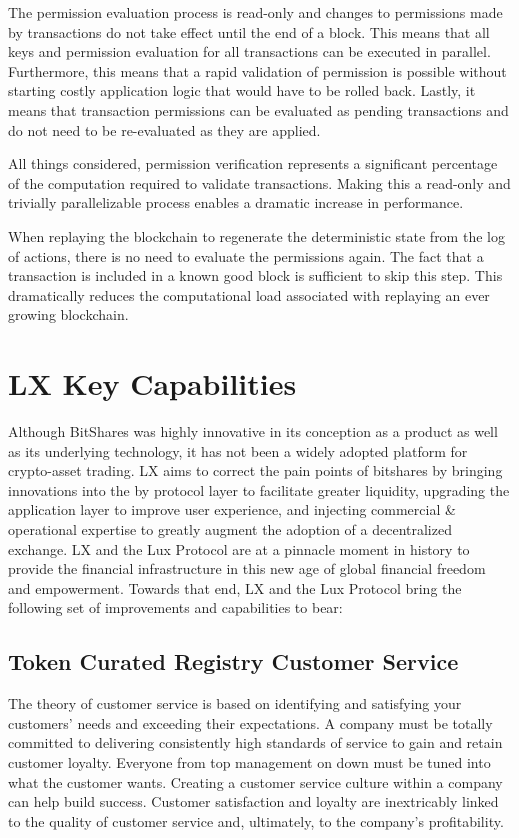 \documentclass[11pt]{article}
\begin{document}
The permission evaluation process is read-only and changes to permissions made by transactions do not take effect until the end of a block. This means that all keys and permission evaluation for all transactions can be executed in parallel. Furthermore, this means that a rapid validation of permission is possible without starting costly application logic that would have to be rolled back. Lastly, it means that transaction permissions can be evaluated as pending transactions and do not need to be re-evaluated as they are applied.


All things considered, permission verification represents a significant percentage of the computation required to validate transactions. Making this a read-only and trivially parallelizable process enables a dramatic increase in performance.


When replaying the blockchain to regenerate the deterministic state from the log of actions, there is no need to evaluate the permissions again. The fact that a transaction is included in a known good block is sufficient to skip this step. This dramatically reduces the computational load associated with replaying an ever growing blockchain.


\section{LX Key Capabilities}

Although BitShares was highly innovative in its conception as a product as well as its underlying technology, it has not been a widely adopted platform for crypto-asset trading. LX aims to correct the pain points of bitshares by bringing innovations into the by protocol layer to facilitate greater liquidity, upgrading the application layer to improve user experience, and injecting commercial \& operational expertise to greatly augment the adoption of a decentralized exchange. LX and the Lux Protocol are at a pinnacle moment in history to provide the financial infrastructure in this new age of global financial freedom and empowerment. Towards that end, LX and the Lux Protocol bring the following set of improvements and capabilities to bear:


\subsection{Token Curated Registry Customer Service}

The theory of customer service is based on identifying and satisfying your customers' needs and exceeding their expectations. A company must be totally committed to delivering consistently high standards of service to gain and retain customer loyalty. Everyone from top management on down must be tuned into what the customer wants. Creating a customer service culture within a company can help build success. Customer satisfaction and loyalty are inextricably linked to the quality of customer service and, ultimately, to the company's profitability.
\end{document}
